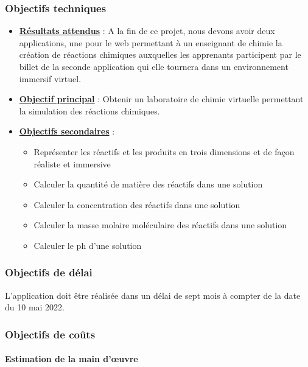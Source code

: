 \subsubsection{Objectifs techniques}
\begin{itemize}
	\item \textbf{\underline{Résultats attendus}} : A la fin de ce projet, nous devons avoir deux applications, une pour le web permettant à un enseignant de chimie la création de réactions chimiques auxquelles les apprenants participent par le billet de la seconde application qui elle tournera dans un environnement immersif virtuel.
	\item \textbf{\underline{Objectif principal}} : Obtenir un laboratoire de chimie virtuelle permettant la simulation des réactions chimiques.
	\item \textbf{\underline{Objectifs secondaires}} :
	      \begin{itemize}
		      \item Représenter les réactifs et les produits en trois dimensions et de façon réaliste et immersive
		      \item Calculer la quantité de matière des réactifs dans une solution
		      \item Calculer la concentration des réactifs dans une solution
		      \item Calculer la masse molaire moléculaire des réactifs dans une solution
		      \item Calculer le ph d’une solution
	      \end{itemize}
\end{itemize}

\subsubsection{Objectifs de délai}

L’application doit être réalisée dans un délai de sept mois à compter de la date du 10 mai 2022.

\subsubsection{Objectifs de coûts}

\paragraph{Estimation de la main d’œuvre}



